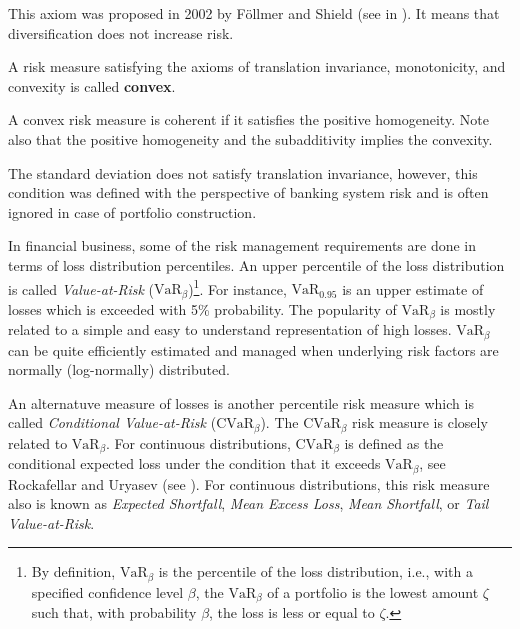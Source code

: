 This axiom  was proposed in 2002 by Föllmer and Shield (see in \cite{Follmer2002}). It means that diversification does not increase risk.

\begin{definition}
	A risk measure satisfying the axioms of translation invariance, monotonicity, and convexity is called \textbf{convex}.
\end{definition}

\begin{proposition}
	A convex risk measure is coherent if it satisfies the positive homogeneity. Note also that the positive homogeneity and the subadditivity implies the convexity.
\end{proposition}

The standard deviation does not satisfy translation invariance, however, this condition was defined with the perspective of banking system risk and is often ignored in case of portfolio construction.

In financial business, some of the risk management requirements are done in terms of loss distribution percentiles. An upper percentile of the loss distribution is called \textit{Value-at-Risk} ($\mbox{VaR}_\beta$)\footnote{By definition, $\mbox{VaR}_\beta$ is the percentile of the loss distribution, i.e., with a specified confidence level $\beta$, the $\mbox{VaR}_\beta$ of a portfolio is the lowest amount $\zeta$ such that, with probability $\beta$, the loss is less or equal to $\zeta$.}. For instance, $\mbox{VaR}_{0.95}$ is an upper estimate of losses which is exceeded with 5\% probability. The popularity of $\mbox{VaR}_\beta$ is mostly related to a simple and easy to understand representation of high losses. $\mbox{VaR}_\beta$ can be quite efficiently estimated and managed when underlying risk factors are normally (log-normally) distributed.

An alternatuve measure of losses is another percentile risk measure which is called \textit{Conditional Value-at-Risk} ($\mbox{CVaR}_\beta$). The $\mbox{CVaR}_\beta$ risk measure is closely related to $\mbox{VaR}_\beta$. For continuous distributions, $\mbox{CVaR}_\beta$ is defined as the conditional expected loss under the condition that it exceeds $\mbox{VaR}_\beta$, see Rockafellar and Uryasev (see \cite{RockafellarUryasev2001}). For continuous distributions, this risk measure also is known as \emph{Expected Shortfall}, \textit{Mean Excess Loss}, \textit{Mean Shortfall}, or \textit{Tail Value-at-Risk}.



